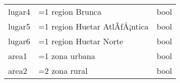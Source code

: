 \documentclass[11pt]{article}
\begin{document}
\begin{longtable}[]{@{}lll@{}}
\begin{minipage}[t]{0.19\columnwidth}\raggedright\strut
lugar4\strut
\end{minipage} & \begin{minipage}[t]{0.16\columnwidth}\raggedright\strut
=1 region Brunca\strut
\end{minipage} & \begin{minipage}[t]{0.24\columnwidth}\raggedright\strut
bool\strut
\end{minipage}\tabularnewline
\begin{minipage}[t]{0.19\columnwidth}\raggedright\strut
lugar5\strut
\end{minipage} & \begin{minipage}[t]{0.16\columnwidth}\raggedright\strut
=1 region Huetar AtlÃƒÂ¡ntica\strut
\end{minipage} & \begin{minipage}[t]{0.24\columnwidth}\raggedright\strut
bool\strut
\end{minipage}\tabularnewline
\begin{minipage}[t]{0.19\columnwidth}\raggedright\strut
lugar6\strut
\end{minipage} & \begin{minipage}[t]{0.16\columnwidth}\raggedright\strut
=1 region Huetar Norte\strut
\end{minipage} & \begin{minipage}[t]{0.24\columnwidth}\raggedright\strut
bool\strut
\end{minipage}\tabularnewline
\begin{minipage}[t]{0.19\columnwidth}\raggedright\strut
area1\strut
\end{minipage} & \begin{minipage}[t]{0.16\columnwidth}\raggedright\strut
=1 zona urbana\strut
\end{minipage} & \begin{minipage}[t]{0.24\columnwidth}\raggedright\strut
bool\strut
\end{minipage}\tabularnewline
\begin{minipage}[t]{0.19\columnwidth}\raggedright\strut
area2\strut
\end{minipage} & \begin{minipage}[t]{0.16\columnwidth}\raggedright\strut
=2 zona rural\strut
\end{minipage} & \begin{minipage}[t]{0.24\columnwidth}\raggedright\strut
bool\strut
\end{minipage}\tabularnewline

\end{longtable}
\end{document}
